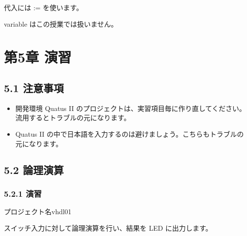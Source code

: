 \documentclass[letterpaper,10pt,dvipdfmx]{sphinxmanual}
\begin{document}
代入には := を使います。

variable はこの授業では扱いません。


\chapter{第5章 演習}
\label{05_try::doc}\label{05_try:id1}

\section{5.1 注意事項}
\label{05_try:id2}\begin{itemize}
\item {} 
開発環境 Quatus II のプロジェクトは、実習項目毎に作り直してください。流用するとトラブルの元になります。

\item {} 
Quatus II の中で日本語を入力するのは避けましょう。こちらもトラブルの元になります。

\end{itemize}


\section{5.2 論理演算}
\label{05_try:id3}

\subsection{5.2.1 演習}
\label{05_try:id4}
プロジェクト名vhdl01

スイッチ入力に対して論理演算を行い、結果を LED に出力します。
\end{document}
